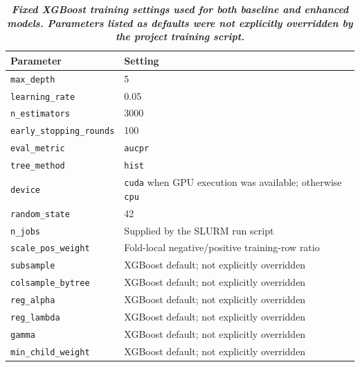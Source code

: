 \begin{table}[!t]
\centering
\caption{\textbf{\textit{Fixed XGBoost training settings used for both baseline and enhanced models. Parameters listed as defaults were not explicitly overridden by the project training script.}}}
\label{tab:phase10_xgb_hyperparameters}
\scriptsize
\setlength{\tabcolsep}{2pt}
\renewcommand{\arraystretch}{1.08}
\begin{tabular}{@{}p{}p{}@{}}
\toprule
\textbf{Parameter} & \textbf{Setting} \\
\midrule
\texttt{max\_depth} & 5 \\
\texttt{learning\_rate} & 0.05 \\
\texttt{n\_estimators} & 3000 \\
\texttt{early\_stopping\_rounds} & 100 \\
\texttt{eval\_metric} & \texttt{aucpr} \\
\texttt{tree\_method} & \texttt{hist} \\
\texttt{device} & \texttt{cuda} when GPU execution was available; otherwise \texttt{cpu} \\
\texttt{random\_state} & 42 \\
\texttt{n\_jobs} & Supplied by the SLURM run script \\
\texttt{scale\_pos\_weight} & Fold-local negative/positive training-row ratio \\
\texttt{subsample} & XGBoost default; not explicitly overridden \\
\texttt{colsample\_bytree} & XGBoost default; not explicitly overridden \\
\texttt{reg\_alpha} & XGBoost default; not explicitly overridden \\
\texttt{reg\_lambda} & XGBoost default; not explicitly overridden \\
\texttt{gamma} & XGBoost default; not explicitly overridden \\
\texttt{min\_child\_weight} & XGBoost default; not explicitly overridden \\
\bottomrule
\end{tabular}
\end{table}
